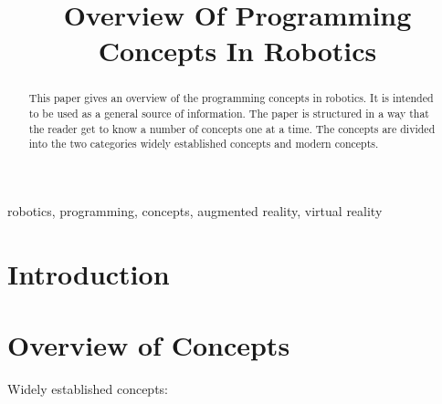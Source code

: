 \documentclass[conference]{IEEEtran}
\begin{document}
\title{Overview Of Programming Concepts In Robotics\\}

\author{

    \and
}

\maketitle

\begin{abstract}
    This paper gives an overview of the programming concepts in robotics. It is intended to be used as a general source of information. The paper is structured in a way that the reader get to know a number of concepts one at a time. The concepts are divided into the two categories widely established concepts and modern concepts.
\end{abstract}

\begin{IEEEkeywords}
    robotics, programming, concepts, augmented reality, virtual reality 
\end{IEEEkeywords}

\section{Introduction}
  
\section{Overview of Concepts}

Widely established concepts:
\end{document}
